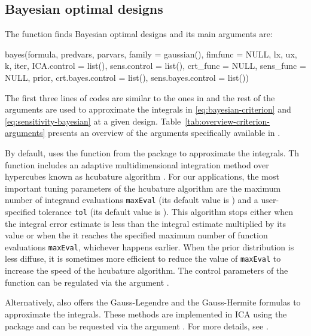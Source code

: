 \subsection{Bayesian optimal designs}\label{sec:Bayesian}
The   function finds Bayesian optimal designs and its main  arguments are:
  \begin{example}
bayes(formula, predvars, parvars, family = gaussian(), fimfunc = NULL,
      lx, ux, k, iter, ICA.control = list(), sens.control = list(),
      crt_func = NULL, sens_func = NULL,
      prior, crt.bayes.control = list(), sens.bayes.control = list())
\end{example}
The first three lines of codes are similar to the ones in  and the rest of the arguments are used  to approximate the integrals in \eqref{eq:bayesian-criterion} and \eqref{eq:sensitivity-bayesian} at a given design.
Table~\ref{tab:overview-criterion-arguments} presents an overview of the  arguments specifically available in .


By default,   uses the  function
from the  package \citep{johnson-cubature, cubature} to approximate the integrals.
Th function   includes an adaptive  multidimensional integration method over hypercubes known as  hcubature algorithm \citep{berntsen1991, genz1980}. For our applications, the most important tuning parameters of  the hcubature algorithm are the maximum number of  integrand evaluations \texttt{maxEval} (its default value is  ) and  a user-specified tolerance  \texttt{tol} (its default value is ). This algorithm stops either when the integral  error estimate is less than the  integral estimate multiplied by its value or when the  it reaches the  specified maximum number of function evaluations \texttt{maxEval}, whichever happens earlier. When the prior distribution is less diffuse, it is sometimes more efficient to reduce  the value of   \texttt{maxEval} to increase the speed of the hcubature  algorithm. The control parameters of the  function can be regulated via the argument .

Alternatively,    also offers  the  Gauss-Legendre  and  the Gauss-Hermite formulas to approximate the integrals.
These methods are implemented in ICA using the   package \citep{mvQuad} and can be requested via the argument . For more details, see .

